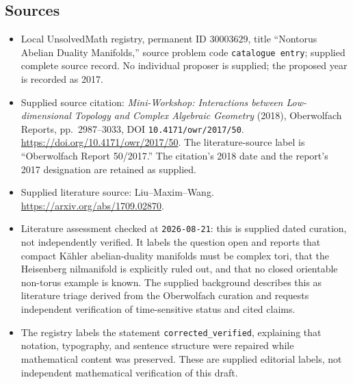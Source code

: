 \documentclass[11pt]{article}
\begin{document}
\subsection{Sources}
\begin{itemize}
\item Local UnsolvedMath registry, permanent ID \(30003629\), title ``Nontorus Abelian Duality Manifolds,'' source problem code \texttt{catalogue entry}; supplied complete source record. No individual proposer is supplied; the proposed year is recorded as 2017.
\item Supplied source citation: \emph{Mini-Workshop: Interactions between Low-dimensional Topology and Complex Algebraic Geometry} (2018), Oberwolfach Reports, pp.\ 2987--3033, DOI \texttt{10.4171/owr/2017/50}. \url{https://doi.org/10.4171/owr/2017/50}. The literature-source label is ``Oberwolfach Report 50/2017.'' The citation's 2018 date and the report's 2017 designation are retained as supplied.
\item Supplied literature source: Liu--Maxim--Wang. \url{https://arxiv.org/abs/1709.02870}.
\item Literature assessment checked at \texttt{2026-08-21}: this is supplied dated curation, not independently verified. It labels the question open and reports that compact K\"ahler abelian-duality manifolds must be complex tori, that the Heisenberg nilmanifold is explicitly ruled out, and that no closed orientable non-torus example is known. The supplied background describes this as literature triage derived from the Oberwolfach curation and requests independent verification of time-sensitive status and cited claims.
\item The registry labels the statement \texttt{corrected\_verified}, explaining that notation, typography, and sentence structure were repaired while mathematical content was preserved. These are supplied editorial labels, not independent mathematical verification of this draft.
\end{itemize}
\end{document}
